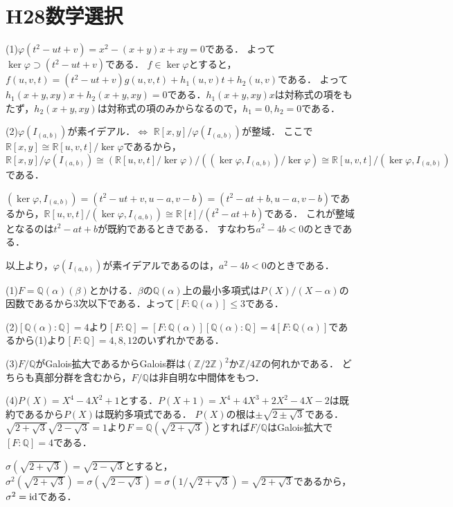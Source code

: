 \documentclass[
		book,
		head_space=20mm,
		foot_space=20mm,
		gutter=10mm,
		line_length=190mm
]{jlreq}
\begin{document}
\section{H28数学選択}
(1)$\varphi(t^2-ut+v)=x^2-(x+y)x+xy=0$である．
よって$\ker \varphi\supset (t^2-ut+v)$である．
$f\in \ker \varphi$とすると，$f(u,v,t)=(t^2-ut+v)g(u,v,t)+h_1(u,v)t+h_2(u,v)$である．
よって$h_1(x+y,xy)x+h_2(x+y,xy)=0$である．$h_1(x+y,xy)x$は対称式の項をもたず，$h_2(x+y,xy)$は対称式の項のみからなるので，$h_1=0,h_2=0$である．

(2)$\varphi(I_{(a,b)})$が素イデアル．$\Leftrightarrow$ $\mathbb{R}[x,y]/\varphi(I_{(a,b)})$が整域．
ここで$\mathbb{R}[x,y]\cong \mathbb{R}[u,v,t]/\ker \varphi$であるから，
$\mathbb{R}[x,y]/\varphi(I_{(a,b)})\cong (\mathbb{R}[u,v,t]/\ker \varphi)/((\ker \varphi,I_{(a,b)})/\ker \varphi)\cong \mathbb{R}[u,v,t]/(\ker \varphi,I_{(a,b)})$である．

$(\ker \varphi,I_{(a,b)})=(t^2-ut+v,u-a,v-b)=(t^2-at+b,u-a,v-b)$であるから，$\mathbb{R}[u,v,t]/(\ker \varphi,I_{(a,b)})\cong \mathbb{R}[t]/(t^2-at+b)$である．
これが整域となるのは$t^2-at+b$が既約であるときである．
すなわち$a^2-4b<0$のときである．

以上より，$\varphi(I_{(a,b)})$が素イデアルであるのは，$a^2-4b<0$のときである．

(1)$F=\mathbb{Q}(\alpha)(\beta)$とかける．$\beta$の$\mathbb{Q}(\alpha)$上の最小多項式は$P(X)/(X-\alpha)$の因数であるから$3$次以下である．よって$[F:\mathbb{Q}(\alpha)]\leq 3$である．

(2)$[\mathbb{Q}(\alpha):\mathbb{Q}]=4$より$[F:\mathbb{Q}]=[F:\mathbb{Q}(\alpha)][\mathbb{Q}(\alpha):\mathbb{Q}]=4[F:\mathbb{Q}(\alpha)]$であるから(1)より$[F:\mathbb{Q}]=4,8,12$のいずれかである．

(3)$F/\mathbb{Q}$がGalois拡大であるからGalois群は$(\mathbb{Z}/2\mathbb{Z})^2$か$\mathbb{Z}/4 \mathbb{Z}$の何れかである．
どちらも真部分群を含むから，$F/\mathbb{Q}$は非自明な中間体をもつ．

(4)$P(X)=X^4-4X^2+1$とする．$P(X+1)=X^4+4X^3+2X^2-4X-2$は既約であるから$P(X)$は既約多項式である．
$P(X)$の根は$\pm{\sqrt{2\pm \sqrt{3}}}$である．
$\sqrt{2+\sqrt{3}}\sqrt{2-\sqrt{3}}=1$より$F=\mathbb{Q}(\sqrt{2+\sqrt{3}})$とすれば$F/\mathbb{Q}$はGalois拡大で$[F:\mathbb{Q}]=4$である．

$\sigma(\sqrt{2+\sqrt{3}})=\sqrt{2-\sqrt{3}}$とすると，$\sigma^2(\sqrt{2+\sqrt{3}})=\sigma(\sqrt{2-\sqrt{3}})=\sigma(1/\sqrt{2+\sqrt{3}})=\sqrt{2+\sqrt{3}}$であるから，$\sigma^2=\mathop{\mathrm{id}}$である．
\end{document}
